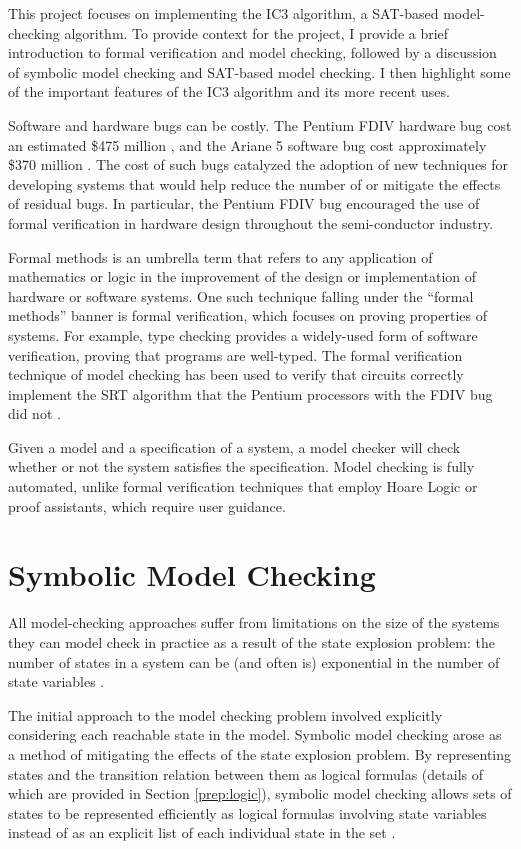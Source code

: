 \documentclass[12pt,a4paper,twoside,openright]{report}
\begin{document}
This project focuses on implementing the IC3 algorithm, a SAT-based model-checking
algorithm.
To provide context for the project,
I provide a brief introduction to formal verification and model checking, followed
by a discussion of symbolic model checking and SAT-based model checking.
I then highlight some of the important features of the IC3 algorithm and its more
recent uses.

Software and hardware bugs can be costly. The Pentium FDIV hardware bug cost an
estimated \$475 million \cite{pratt95}, and the Ariane 5 software bug cost
approximately \$370 million \cite{dowson97}.
The cost of such bugs catalyzed the adoption of new techniques for developing systems
that would help reduce the number of or mitigate the effects of residual bugs.
In particular, the Pentium FDIV bug encouraged the use of formal verification in
hardware design throughout the semi-conductor industry.

Formal methods is an umbrella term that refers to any application of mathematics or logic
in the improvement of the design or implementation of hardware or software systems.
One such technique falling under the ``formal methods'' banner is formal verification,
which focuses on proving properties of
systems.
For example, type checking provides a widely-used form of software verification,
proving that programs are well-typed. The formal verification technique of model
checking has been used to verify that circuits correctly implement the SRT
algorithm that the Pentium processors with the FDIV bug did not \cite{clarke96}.

Given a model and a specification of a system, a model checker will check whether or
not the system satisfies the specification.
Model checking is fully automated, unlike formal verification techniques that employ
Hoare Logic or proof assistants, which require user guidance.

\section{Symbolic Model Checking}

All model-checking approaches suffer from limitations on the size
of the systems they can model check in practice as a result of
the state explosion problem: the number of
states in a system can be (and often is) exponential in the
number of state variables \cite{clarke12}. 

The initial approach to the model checking problem involved explicitly
considering each reachable state in the model.
Symbolic model checking arose as a method of mitigating the effects of
the state explosion problem. By representing
states and the transition relation between them as logical formulas
(details of which are provided in Section \ref{prep:logic}),
symbolic model checking allows sets of states to be
represented efficiently as logical formulas involving state variables
instead of as an explicit list of each individual state in the set
\cite{mcmillan92}. 
\end{document}
